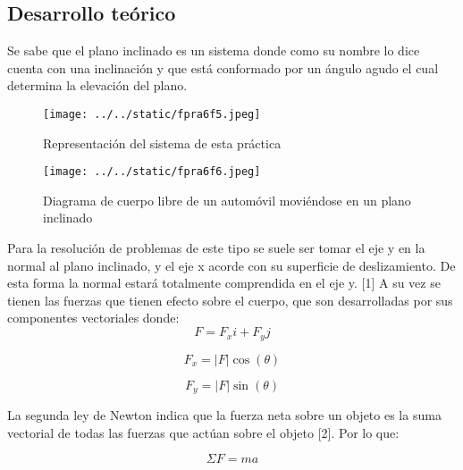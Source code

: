 \documentclass{article}
\begin{document}

\begin{multicols}{2}

\section{Desarrollo teórico}\label{Desarrollo Teorico}                              	%
Se sabe que el plano inclinado es un sistema donde como su nombre lo dice cuenta con una inclinación y que está conformado por un ángulo agudo el cual determina la elevación del plano.
\begin{figure}[H]
	\centering
	\texttt{[image: ../../static/fpra6f5.jpeg]}
	\caption{Representación del sistema de esta práctica}
	\label{fig:1}
\end{figure}

\begin{figure}[H]
	\centering
	\texttt{[image: ../../static/fpra6f6.jpeg]}
	\caption{Diagrama de cuerpo libre de un automóvil moviéndose en un plano inclinado}
	\label{fig:2}
\end{figure}

Para la resolución de problemas de este tipo se suele ser tomar el eje y en la normal al plano inclinado, y el eje x acorde con su superficie de deslizamiento. De esta forma la normal estará totalmente comprendida en el eje y. [1] A su vez se tienen las fuerzas que tienen efecto sobre el cuerpo, que son desarrolladas por sus componentes vectoriales donde: 
\begin{equation*}
	F = F_xi + F_yj
\end{equation*}

\begin{equation*}
	F_x = \left|F\right|\cos(\theta)
\end{equation*}

\begin{equation*}
	F_y = \left|F\right|\sin(\theta)
\end{equation*}

La segunda ley de Newton indica que la fuerza neta sobre un objeto es la suma vectorial de todas las fuerzas que actúan sobre el objeto [2]. Por lo que:

\begin{equation*}
	\Sigma F = ma
\end{equation*}


\end{multicols}
\end{document}
